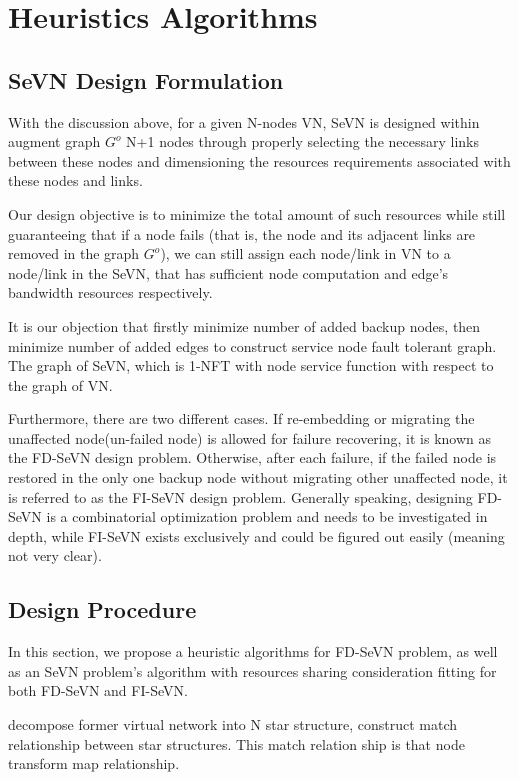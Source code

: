 \section{Heuristics Algorithms}



\subsection{SeVN Design Formulation}
With the discussion above, for a given N-nodes VN, SeVN is designed within augment graph $G^o$ N+1 nodes through properly selecting the necessary links between these nodes and dimensioning the resources requirements associated with these nodes and links.

Our design objective is to minimize the total amount of such resources while still guaranteeing that if a node fails (that is, the node and its adjacent links are removed in the graph $G^o$), we can still assign each node/link in VN to a node/link in the SeVN, that has sufficient node computation and edge's bandwidth resources respectively.

It is our objection that firstly minimize number of added backup nodes, then minimize number of added edges to construct service node fault tolerant graph. The graph of SeVN, which is 1-NFT with node service function with respect to the graph of VN.


Furthermore, there are two different cases. If re-embedding or migrating the unaffected node(un-failed node) is allowed for failure recovering, it is known as the FD-SeVN design problem. Otherwise, after each failure, if the failed node is restored in the only one backup node without migrating other unaffected node, it is referred to as the FI-SeVN design problem. Generally speaking, designing FD-SeVN is a combinatorial optimization problem and needs to be investigated in depth, while FI-SeVN exists exclusively and could be figured out easily (meaning not very clear).


\subsection{Design Procedure}

In this section, we propose a heuristic algorithms for FD-SeVN problem, as well as an SeVN problem's algorithm with resources sharing consideration fitting for both FD-SeVN and FI-SeVN.

decompose former virtual network into N star structure, construct match relationship between star structures. This match relation ship is that node transform map relationship.

